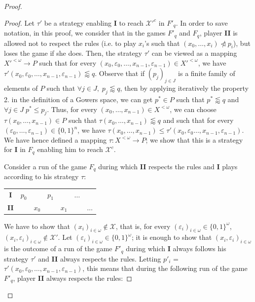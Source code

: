 \documentclass[a4paper,11pt]{article}
\theoremstyle{definition}
\numberwithin{equation}{section}
\newcommand{\X}{\mathcal{X}}
\newcommand{\I}{\textbf{I}}
\newcommand{\II}{\textbf{II}}
\begin{document}
\begin{proof}
\begin{proof}
Let $\tau'$ be a strategy enabling \I{} to reach $\X'^c$ in $F'_q$. In order to save notation, in this proof, we consider that in the games $F'_q$ and $F_q$, player \II{} is allowed not to respect the rules (i.e. to play $x_i$'s such that $(x_0, \ldots, x_i) \ntriangleleft p_i$), but loses the game if she does. Then, the strategy $\tau'$ can be viewed as a mapping $X'^{< \omega} \longrightarrow P$ such that for every $(x_0, \varepsilon_0, \ldots, x_{n - 1}, \varepsilon_{n - 1}) \in X'^{< \omega}$, we have $\tau'(x_0, \varepsilon_0, \ldots, x_{n - 1}, \varepsilon_{n - 1}) \lessapprox q$. Observe that if $(p_j)_{j \in J}$ is a finite family of elements of $P$ such that $\forall j \in J, \; p_j \lessapprox q$, then by applying iteratively the property 2. in the definition of a Gowers space, we can get $p^* \in P$ such that $p^* \lessapprox q$ and $\forall j \in J \; p^* \leqslant p_j$. Thus, for every $(x_0, \ldots, x_{n - 1}) \in X^{< \omega}$, we can choose $\tau(x_0, \ldots, x_{n - 1}) \in P$ such that $\tau(x_0, \ldots, x_{n - 1}) \lessapprox q$ and such that for every $(\varepsilon_0, \ldots, \varepsilon_{n - 1}) \in \{0, 1\}^n$, we have $\tau(x_0, \ldots, x_{n - 1}) \leqslant \tau'(x_0, \varepsilon_0 \ldots, x_{n - 1}, \varepsilon_{n - 1})$. We have hence defined a mapping $\tau : X^{< \omega} \longrightarrow P$; we show that this is a strategy for \I{} in $F_q$ enabling him to reach $\X^c$.

\smallskip

Consider a run of the game $F_q$ during which \II{} respects the rules and \I{} plays according to his strategy $\tau$:

\smallskip

\begin{tabular}{ccccccc}
\textbf{I} & $p_0$ & & $p_1$ & & $\hdots$ & \\
\textbf{II} & & $x_0$ & & $x_1$ & & $\hdots$ 
\end{tabular}

\smallskip

\noindent We have to show that $(x_i)_{i \in \omega} \notin \X$, that is, for every $(\varepsilon_i)_{i \in \omega} \in \{0, 1\}^\omega$, $(x_i, \varepsilon_i)_{i \in \omega} \notin \X'$. Let $(\varepsilon_i)_{i \in \omega} \in \{0, 1\}^\omega$; it is enough to show that $(x_i, \varepsilon_i)_{i \in \omega}$ is the outcome of a run of the game $F'_q$ during which \I{} always follows his strategy $\tau'$ and \II{} always respects the rules. Letting $p'_i$ = $\tau'(x_0, \varepsilon_0, \ldots, x_{n - 1}, \varepsilon_{n - 1})$, this means that during the following run of the game $F'_q$, player \II{} always respects the rules:


\end{proof}
\end{proof}
\end{document}
